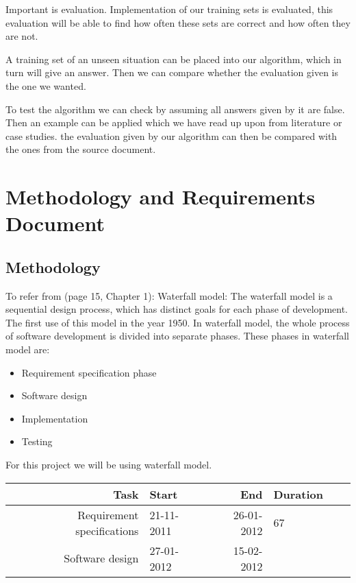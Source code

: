 \documentclass{report}
\begin{document}
Important is evaluation. Implementation of our training sets is evaluated, this evaluation will be able to find how often these sets are correct and how often they are not.

A training set of an unseen situation can be placed into our algorithm, which in turn will give an answer. Then we can compare whether the evaluation given is the one we wanted.

To test the algorithm we can check by assuming all answers given by it are false. Then an example can be applied which we have read up upon from literature or case studies. the evaluation given by our algorithm can then be compared with the ones from the source document.



\chapter{Methodology and Requirements Document}
\label{cha:methrecdoc}

\section{Methodology}
\label{sec:meth}

To refer from \cite{Hamlet2001TheEngineeringofSoftware}(page 15, Chapter 1): Waterfall model: The waterfall model is a sequential design process, which has distinct goals for each phase of development. The first use of this model in the year 1950. In waterfall model, the whole process of software development is divided into separate phases. These phases in waterfall model are:
\begin{itemize}
\item Requirement specification phase
\item Software design
\item Implementation 
\item Testing 

\end{itemize}

For this project we will be using waterfall model. 

\begin{tabular}{|r|l|r|l|r|l|}

\hline
Task & Start & End & Duration\\
\hline
Requirement specifications & 21-11-2011 & 26-01-2012 & 67 &
\\\hline
Software design & 27-01-2012 & 15-02-2012 & 





\end{tabular}
\end{document}
